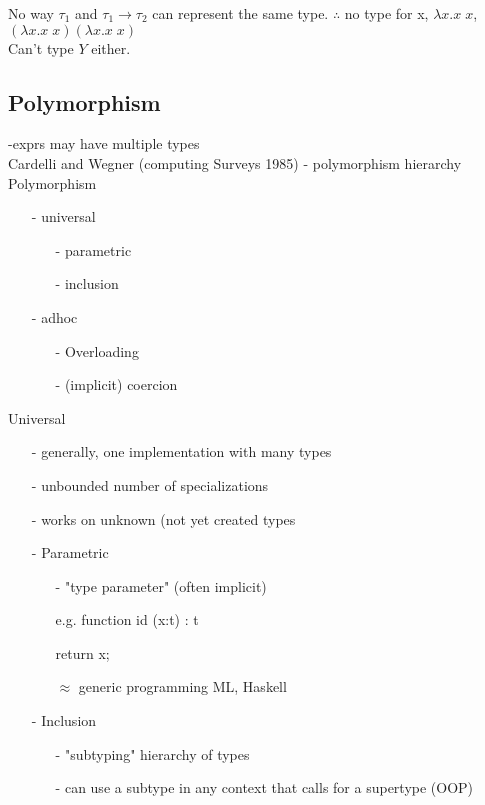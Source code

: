 \documentclass[11pt]{article}
\begin{document}
No way $\tau_1$ and $\tau_1 \rightarrow \tau_2$ can represent the same type. $\therefore$ no type for x, $\lambda x.x\;x$, $(\lambda x.x\;x)(\lambda x.x\;x)$ \\

Can't type $Y$ either. \\

\subsection{Polymorphism}

-exprs may have multiple types \\

Cardelli and Wegner (computing Surveys 1985) - polymorphism hierarchy \\

Polymorphism
\begin{itemize}
	\item[-] universal 
		\begin{itemize}
			\item[-] parametric
			\item[-] inclusion
		\end{itemize}
	\item[-] adhoc
		\begin{itemize}
			\item[-] Overloading
			\item[-] (implicit) coercion
		\end{itemize}
\end{itemize}

Universal 
\begin{itemize}
	\item[-] generally, one implementation with many types
	\item[-] unbounded number of specializations
	\item[-] works on unknown (not yet created types
	\item[-] Parametric
	\begin{itemize}
		\item[-] "type parameter" (often implicit)
		\item[e.g.] function id (x:t) : t
		\item[] return x;
		\item[$\approx$] generic programming ML, Haskell
	\end{itemize}
	\item[-] Inclusion
	\begin{itemize}
		\item[-] "subtyping" hierarchy of types
		\item[-] can use a subtype in any context that calls for a supertype (OOP)
	\end{itemize}
\end{itemize}
\end{document}
